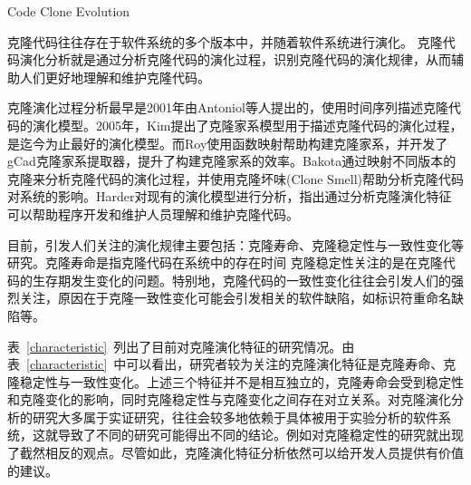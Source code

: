 {Code Clone Evolution}
\label{ref-evolution}

克隆代码往往存在于软件系统的多个版本中，并随着软件系统进行演化。
克隆代码演化分析就是通过分析克隆代码的演化过程，识别克隆代码的演化规律，从而辅助人们更好地理解和维护克隆代码。

克隆演化过程分析最早是2001年由Antoniol等人提出的，使用时间序列描述克隆代码的演化模型\cite{antoniol2001modeling}。2005年，Kim提出了克隆家系模型用于描述克隆代码的演化过程，是迄今为止最好的演化模型\cite{kim2005empirical}。而Roy使用函数映射帮助构建克隆家系，并开发了gCad克隆家系提取器，提升了构建克隆家系的效率\cite{saha2011automatic}。Bakota通过映射不同版本的克隆来分析克隆代码的演化过程，并使用克隆坏味(Clone Smell)帮助分析克隆代码对系统的影响\cite{bakota2011tracking}。Harder对现有的演化模型进行分析\cite{harder2009modeling}，指出通过分析克隆演化特征可以帮助程序开发和维护人员理解和维护克隆代码。

目前，引发人们关注的演化规律主要包括：克隆寿命、克隆稳定性与一致性变化等研究。克隆寿命是指克隆代码在系统中的存在时间
克隆稳定性关注的是在克隆代码的生存期发生变化的问题。特别地，克隆代码的一致性变化往往会引发人们的强烈关注，原因在于克隆一致性变化可能会引发相关的软件缺陷，如标识符重命名缺陷等。

表~\ref{characteristic}~列出了目前对克隆演化特征的研究情况。由表~\ref{characteristic}~中可以看出，研究者较为关注的克隆演化特征是克隆寿命、克隆稳定性与一致性变化。上述三个特征并不是相互独立的，克隆寿命会受到稳定性和克隆变化的影响，同时克隆稳定性与克隆变化之间存在对立关系。对克隆演化分析的研究大多属于实证研究，往往会较多地依赖于具体被用于实验分析的软件系统，这就导致了不同的研究可能得出不同的结论。例如对克隆稳定性的研究就出现了截然相反的观点。尽管如此，克隆演化特征分析依然可以给开发人员提供有价值的建议。


